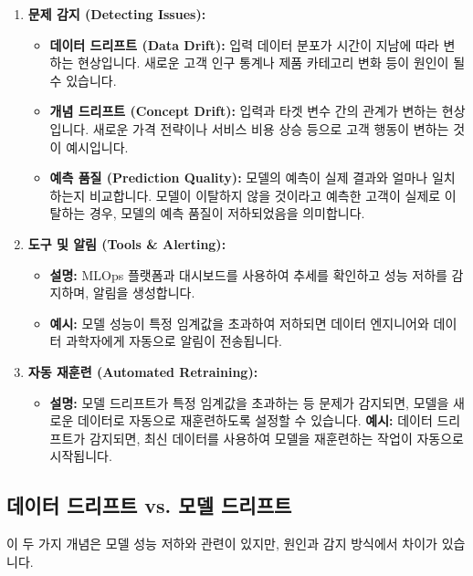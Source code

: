 \documentclass[11pt,a4paper]{article}
\theoremstyle{definition}
\begin{document}
\begin{enumerate}
    \item \textbf{문제 감지 (Detecting Issues):}
    \begin{itemize}
        \item \textbf{데이터 드리프트 (Data Drift):} 입력 데이터 분포가 시간이 지남에 따라 변하는 현상입니다. 새로운 고객 인구 통계나 제품 카테고리 변화 등이 원인이 될 수 있습니다.
        \item \textbf{개념 드리프트 (Concept Drift):} 입력과 타겟 변수 간의 관계가 변하는 현상입니다. 새로운 가격 전략이나 서비스 비용 상승 등으로 고객 행동이 변하는 것이 예시입니다.
        \item \textbf{예측 품질 (Prediction Quality):} 모델의 예측이 실제 결과와 얼마나 일치하는지 비교합니다. 모델이 이탈하지 않을 것이라고 예측한 고객이 실제로 이탈하는 경우, 모델의 예측 품질이 저하되었음을 의미합니다.
    \end{itemize}

    \item \textbf{도구 및 알림 (Tools \& Alerting):}
    \begin{itemize}
        \item \textbf{설명:} MLOps 플랫폼과 대시보드를 사용하여 추세를 확인하고 성능 저하를 감지하며, 알림을 생성합니다.
        \item \textbf{예시:} 모델 성능이 특정 임계값을 초과하여 저하되면 데이터 엔지니어와 데이터 과학자에게 자동으로 알림이 전송됩니다.
    \end{itemize}

    \item \textbf{자동 재훈련 (Automated Retraining):}
    \begin{itemize}
        \item \textbf{설명:} 모델 드리프트가 특정 임계값을 초과하는 등 문제가 감지되면, 모델을 새로운 데이터로 자동으로 재훈련하도록 설정할 수 있습니다.
        \textbf{예시:} 데이터 드리프트가 감지되면, 최신 데이터를 사용하여 모델을 재훈련하는 작업이 자동으로 시작됩니다.
    \end{itemize}
\end{enumerate}

\subsection{데이터 드리프트 vs. 모델 드리프트}

이 두 가지 개념은 모델 성능 저하와 관련이 있지만, 원인과 감지 방식에서 차이가 있습니다.
\end{document}
